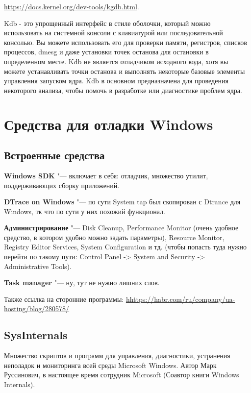 \documentclass[bachelor, och, book]{SCWorks}
\theoremstyle{remark}
\begin{document}
    \href{https://docs.kernel.org/dev-tools/kgdb.html}{https://docs.kernel.org/dev-tools/kgdb.html}.


    Kdb - это упрощенный интерфейс в стиле оболочки, который можно использовать на системной консоли с клавиатурой или последовательной консолью. Вы можете использовать его для проверки памяти, регистров, списков процессов, dmesg и даже установки точек останова для остановки в определенном месте. Kdb не является отладчиком исходного кода, хотя вы можете устанавливать точки останова и выполнять некоторые базовые элементы управления запуском ядра. Kdb в основном предназначена для проведения некоторого анализа, чтобы помочь в разработке или диагностике проблем ядра. 


    \section{Средства для отладки Windows}
    
    \subsection{Встроенные средства}
    
    \textbf{Windows SDK} "--- включает в себя: отладчик, множество утилит, поддерживающих сборку приложений.
    
    \textbf{DTrace on Windows} "--- по сути System tap был скопирован с Dtrance для Windows, тк что по сути у них похожий функционал.

    \textbf{Администрирование} "--- Disk Cleanup, Performance Monitor (очень удобное средство, в котором удобно можно задать параметры), Resource Monitor, Registry Editor Services, System Configuration и тд. (чтобы попасть туда нужно перейти по такому пути: Control Panel -> System and Security -> Administrative Tools).

    \textbf{Task manager} "--- ну, тут не нужно лишних слов.


    Также ссылка на сторонние программы: 
    \href{https://habr.com/ru/company/ua-hosting/blog/280578/}{hhttps://habr.com/ru/company/ua-hosting/blog/280578/}


    \subsection{SysInternals}

    Множество скриптов и программ для управления, диагностики, устранения неполадок и мониторинга всей среды Microsoft Windows. Автор Марк Руссинович, в настоящее время сотрудник Microsoft (Соавтор книги Windows Internals).
\end{document}

